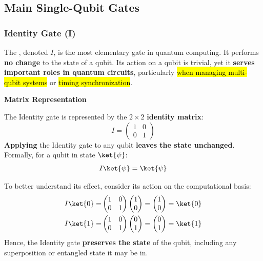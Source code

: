\subsection{Main Single-Qubit Gates}

\subsubsection{Identity Gate (I)}\label{sec:identity-gate}

The , denoted $I$, is the most elementary gate in quantum computing. It performs \textbf{no change} to the state of a qubit. Its action on a qubit is trivial, yet it \textbf{serves important roles in quantum circuits}, particularly \hl{when managing multi-qubit systems} or \hl{timing synchronization}.

\highspace
\begin{flushleft}
    \textcolor{Green3}{ \textbf{Matrix Representation}}
\end{flushleft}
The Identity gate is represented by the $2 \times 2$ \textbf{identity matrix}:
\begin{equation}
    I = \begin{pmatrix}
        1 & 0 \\ 0 & 1
    \end{pmatrix}
\end{equation}
\textbf{Applying} the Identity gate to any qubit \textbf{leaves the state unchanged}. Formally, for a qubit in state $\ket{\psi}$:
\begin{equation*}
    I \ket{\psi} = \ket{\psi}
\end{equation*}

\highspace
To better understand its effect, consider its action on the computational basis:
\begin{align*}
    I\ket{0} =& \begin{pmatrix}
        1 & 0 \\ 0 & 1
    \end{pmatrix}
    \begin{pmatrix}
        1 \\ 0
    \end{pmatrix} =
    \begin{pmatrix}
        1 \\ 0
    \end{pmatrix} = \ket{0} \\
    I\ket{1} =& \begin{pmatrix}
        1 & 0 \\ 0 & 1
    \end{pmatrix}
    \begin{pmatrix}
        0 \\ 1
    \end{pmatrix} =
    \begin{pmatrix}
        0 \\ 1
    \end{pmatrix} = \ket{1}
\end{align*}
Hence, the Identity gate \textbf{preserves the state} of the qubit, including any superposition or entangled state it may be in.

